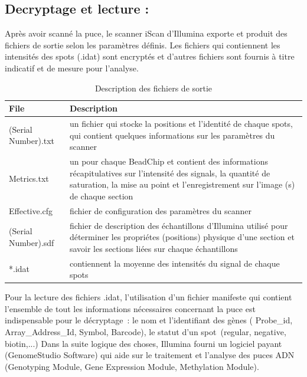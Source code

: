 \documentclass[a4paper,10pt]{article}
\begin{document}
\subsection{ Decryptage et lecture :}
Après avoir scanné la puce, le scanner iScan d’Illumina exporte et produit des fichiers de sortie selon les paramètres définis.
Les fichiers qui contiennent les intensités des spots (.idat) sont encryptés et d’autres fichiers sont fournis à titre indicatif et de mesure pour l’analyse.\\
\begin{table}[!h]
\begin{tabular}{|l|p{9cm}|}
\hline
File  & Description \\
\hline
 (Serial Number).txt & un fichier qui stocke la positions et l'identité de chaque spots, qui contient quelques informations sur les paramètres du scanner\\
\hline
Metrics.txt &  un pour chaque BeadChip  et contient des informations récapitulatives sur l'intensité des signals,
la quantité de saturation, la mise au point et l'enregistrement sur l'image (s) de chaque section \\
\hline 
Effective.cfg & fichier de configuration des paramètres du scanner\\
\hline
(Serial Number).sdf & fichier de description des échantillons d'Illumina utilisé pour déterminer les propriétes (positions)
physique d'une section et savoir les sections liées sur chaque échantillons\\
\hline
*.idat & contiennent la moyenne des intensités du signal de chaque spots \\
\hline
\end{tabular}
\caption{Description des fichiers de sortie}
\label{Fichiers_Sorties}
\end{table}
\newline
Pour la lecture  des fichiers .idat, l’utilisation d’un fichier manifeste qui contient l’ensemble de tout les informations nécessaires concernant la puce est indispensable pour le décryptage : le nom et l’identifiant  des gènes ( Probe\_id, Array\_Address\_Id, Symbol, Barcode), le statut d’un spot (regular, negative, biotin,...)
Dans la suite logique des choses, Illumina fourni un logiciel payant (GenomeStudio Software)  qui aide sur le traitement et l'analyse des puces ADN (Genotyping Module, Gene Expression Module, Methylation Module).
\end{document}

